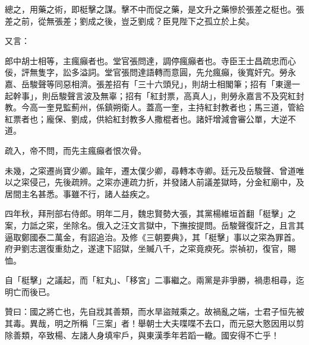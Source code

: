 \begin{pinyinscope}
總之，用藥之術，即梃擊之謀。擊不中而促之藥，是文升之藥慘於張差之梃也。張差之前，從無張差；劉成之後，豈乏劉成？臣見陛下之孤立於上矣。

又言：

郎中胡士相等，主瘋癲者也。堂官張問達，調停瘋癲者也。寺臣王士昌疏忠而心佞，評無隻字，訟多溢詞。堂官張問達語轉而意圓，先允瘋癲，後寬奸宄。勞永嘉、岳駿聲等同惡相濟。張差招有「三十六頭兒」，則胡士相閣筆；招有「東邊一起幹事」，則岳駿聲言波及無辜；招有「紅封票，高真人」，則勞永嘉言不及究紅封教。今高一奎見監薊州，係鎮朔衛人。蓋高一奎，主持紅封教者也；馬三道，管給紅票者也；龐保、劉成，供給紅封教多人撒棍者也。諸奸增減會審公單，大逆不道。

疏入，帝不問，而先主瘋癲者恨次骨。

未幾，之寀遷尚寶少卿。踰年，遷太僕少卿，尋轉本寺卿。廷元及岳駿聲、曾道唯以之寀侵己，先後疏辨。之寀亦連疏力折，并發諸人前議差獄時，分金紅廟中，及居間主名甚悉。事雖不行，諸人益疾之。

四年秋，拜刑部右侍郎。明年二月，魏忠賢勢大張，其黨楊維垣首翻「梃擊」之案，力詆之寀，坐除名。俄入之汪文言獄中，下撫按提問。岳駿聲復訐之，且言其逼取鄭國泰二萬金，有詔追治。及修《三朝要典》，其「梃擊」事以之寀為罪首。府尹劉志選復重劾之，遂逮下詔獄，坐贓八千，之寀竟瘐死。崇禎初，復官，賜恤。

自「梃擊」之議起，而「紅丸」、「移宮」二事繼之。兩黨是非爭勝，禍患相尋，迄明亡而後已。

贊曰：國之將亡也，先自戕其善類，而水旱盜賊乘之。故禍亂之端，士君子恒先被其毒。異哉，明之所稱「三案」者！舉朝士大夫喋喋不去口，而元惡大憝因用以剪除善類，卒致楊、左諸人身填牢戶，與東漢季年若蹈一轍。國安得不亡乎！


\end{pinyinscope}